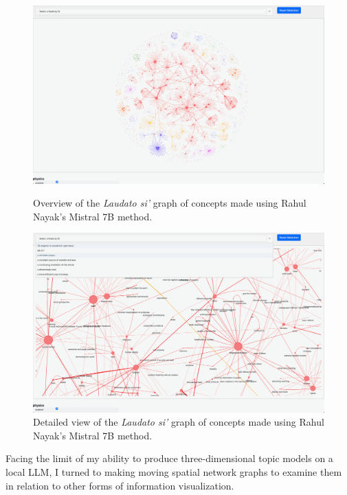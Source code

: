 \begin{figure}[h]
    \centering
    \begin{minipage}[t]{0.48\linewidth}
        \centering
        \includegraphics[width=\linewidth]{figures/4.11.png}
        \caption[Overview of the \textit{Laudato si'} graph of concepts]{Overview of the \textit{Laudato si'} graph of concepts made using Rahul Nayak’s Mistral 7B method.}
        \label{f4.11}
    \end{minipage}%
    \hfill
    \begin{minipage}[t]{0.48\linewidth}
        \centering
        \includegraphics[width=\linewidth]{figures/4.12.png}
        \caption[Detailed view of the \textit{Laudato si'} graph of concepts]{Detailed view of the \textit{Laudato si'} graph of concepts made using Rahul Nayak’s Mistral 7B method.}
        \label{f4.12}
    \end{minipage}
\end{figure}

\par
Facing the limit of my ability to produce three-dimensional topic models on a local LLM, I turned to making moving spatial network graphs to examine them in relation to other forms of information visualization. 


